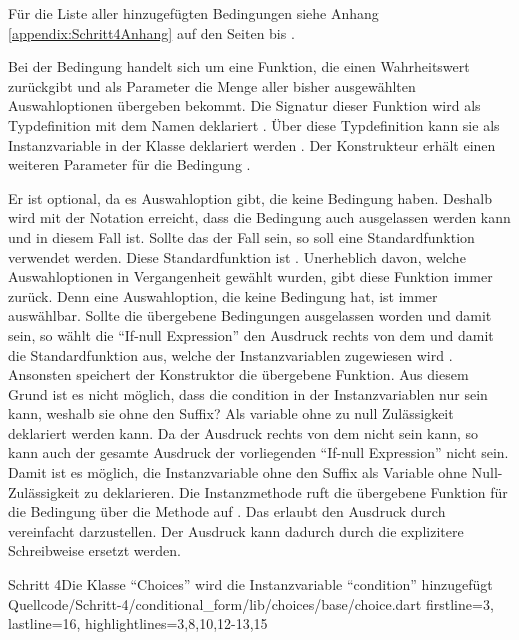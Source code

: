 Für die Liste aller hinzugefügten Bedingungen siehe Anhang \ref{appendix:Schritt4Anhang} auf den Seiten \pageref{lst:Schritt4KategorieChoice} bis  \pageref{lst:Schritt4ZieleinheitChoice}.

Bei der Bedingung handelt sich um eine Funktion,
die einen Wahrheitswert  zurückgibt und als Parameter die Menge aller bisher ausgewählten Auswahloptionen  übergeben bekommt.
Die Signatur dieser Funktion wird als Typdefinition mit dem Namen  deklariert .
Über diese Typdefinition kann sie als Instanzvariable in der Klasse  deklariert werden .
Der Konstrukteur erhält einen weiteren Parameter für die Bedingung .

Er ist optional,
da es Auswahloption gibt,
die keine Bedingung haben.
Deshalb wird mit der Notation  erreicht,
dass die Bedingung auch ausgelassen werden kann und in diesem Fall  ist.
Sollte das der Fall sein,
so soll eine Standardfunktion verwendet werden.
Diese Standardfunktion ist  .
Unerheblich davon,
 welche Auswahloptionen in Vergangenheit gewählt wurden,
gibt diese Funktion immer  zurück.
Denn eine Auswahloption,
die keine Bedingung hat,
ist immer auswählbar.
Sollte die übergebene Bedingungen ausgelassen worden und damit  sein,
so wählt die \enquote{If-null Expression} den Ausdruck rechts von dem  und damit die Standardfunktion  aus,
welche der Instanzvariablen  zugewiesen wird .
Ansonsten speichert der Konstruktor die übergebene Funktion.
Aus diesem Grund ist es nicht möglich,
dass die condition in der Instanzvariablen nur sein kann,
weshalb sie ohne den Suffix? Als variable ohne zu null Zulässigkeit deklariert werden kann.
Da der Ausdruck rechts von dem  nicht  sein kann,
so kann auch der gesamte Ausdruck der vorliegenden \enquote{If-null Expression} nicht  sein.
Damit ist es möglich,
die Instanzvariable  ohne den Suffix  als Variable ohne Null-Zulässigkeit zu deklarieren.
Die Instanzmethode  ruft die übergebene Funktion für die Bedingung über die Methode  auf .
Das erlaubt den Ausdruck  durch vereinfacht darzustellen.
Der Ausdruck  kann dadurch durch die explizitere Schreibweise  ersetzt werden.

\begin{alexlisting}{Schritt 4}{Die Klasse \enquote{Choices} wird die Instanzvariable \enquote{condition} hinzugefügt}
  {Quellcode/Schritt-4/conditional_form/lib/choices/base/choice.dart}
  {firstline=3, lastline=16, highlightlines={3,8,10,12-13,15 }}
  \label{lst:Schritt4Choice}
\end{alexlisting}

